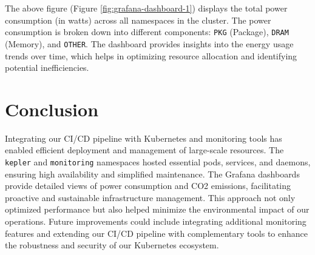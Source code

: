 The above figure (Figure \ref{fig:grafana-dashboard-1}) displays the total power consumption (in watts) across all namespaces in the cluster. The power consumption is broken down into different components: \texttt{PKG} (Package), \texttt{DRAM} (Memory), and \texttt{OTHER}. The dashboard provides insights into the energy usage trends over time, which helps in optimizing resource allocation and identifying potential inefficiencies.



\newpage

\section*{Conclusion}

Integrating our CI/CD pipeline with Kubernetes and monitoring tools has enabled efficient deployment and management of large-scale resources. The \texttt{kepler} and \texttt{monitoring} namespaces hosted essential pods, services, and daemons, ensuring high availability and simplified maintenance.
The Grafana dashboards provide detailed views of power consumption and CO2 emissions, facilitating proactive and sustainable infrastructure management. This approach not only optimized performance but also helped minimize the environmental impact of our operations.
Future improvements could include integrating additional monitoring features and extending our CI/CD pipeline with complementary tools to enhance the robustness and security of our Kubernetes ecosystem.

\pagebreak